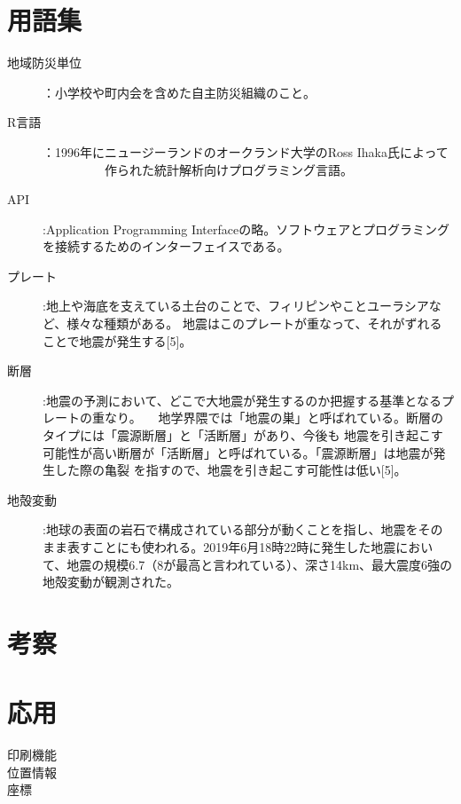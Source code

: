 \documentclass[report]{jsbook}
\begin{document}
\chapter{用語集}
\begin{description}
\item[地域防災単位]：小学校や町内会を含めた自主防災組織のこと。
\item[R言語]：1996年にニュージーランドのオークランド大学のRoss Ihaka氏によって
  　　　　　作られた統計解析向けプログラミング言語。
  \item[API]:Application Programming Interfaceの略。ソフトウェアとプログラミングを接続するためのインターフェイスである。
\item[プレート]:地上や海底を支えている土台のことで、フィリピンやことユーラシアなど、様々な種類がある。 地震はこのプレートが重なって、それがずれることで地震が発生する[5]。
\item[断層]:地震の予測において、どこで大地震が発生するのか把握する基準となるプレートの重なり。
  　地学界隈では「地震の巣」と呼ばれている。断層のタイプには「震源断層」と「活断層」があり、今後も
  地震を引き起こす可能性が高い断層が「活断層」と呼ばれている。「震源断層」は地震が発生した際の亀裂
  を指すので、地震を引き起こす可能性は低い[5]。
  
\item[地殻変動]:地球の表面の岩石で構成されている部分が動くことを指し、地震をそのまま表すことにも使われる。2019年6月18時22時に発生した地震において、地震の規模6.7（8が最高と言われている）、深さ14km、最大震度6強の地殻変動が観測された。
\end{description}
\chapter{考察}

\chapter{応用}
\begin{description}
\item[印刷機能]
\item[位置情報]
  \item[座標]
  \end{description}
\end{document}
